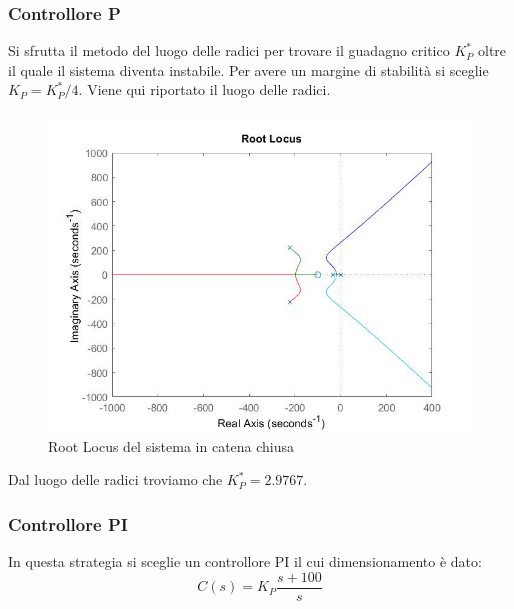 \documentclass[a4paper,11pt, Arial]{article}
\begin{document}
\subsubsection{Controllore P}
Si sfrutta il metodo del luogo delle radici per trovare il guadagno critico $K_P^*$ oltre il quale il sistema diventa instabile. Per avere un margine di stabilità si sceglie $K_P=K_P^* /4$. Viene qui riportato il luogo delle radici. 
\begin{figure}[H]
\centering
\includegraphics[scale=0.3]{rlocus.jpg}
\caption{Root Locus del sistema in catena chiusa}
\end{figure}
Dal luogo delle radici troviamo che $K_P^* = 2.9767 $.
\subsubsection{Controllore PI}
In questa strategia si sceglie un controllore PI il cui dimensionamento è dato: 
\begin{equation}
C(s)=K_P\frac{s + 100}{s}
\end{equation}
\end{document}
